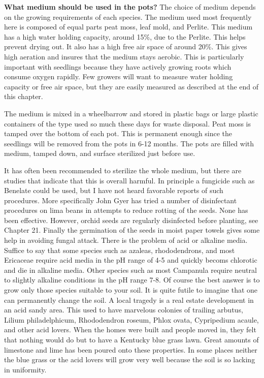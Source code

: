 \textbf{What medium should be used in the pots?} The choice of medium
depends on the growing requirements of each species. The medium used most
frequently here is composed of equal parts peat moss, leaf mold, and Perlite. This
medium has a high water holding capacity, around 15\%, due to the Perlite. This helps
prevent drying out. It also has a high free air space of around 20\%. This gives high
aeration and insures that the medium stays aerobic. This is particularly important with
seedlings because they have actively growing roots which consume oxygen rapidly.
Few growers will want to measure water holding capacity or free air space, but they
are easily measured as described at the end of this chapter.

The medium is mixed in a wheelbarrow and stored in plastic bags or large
plastic containers of the type used so much these days for waste disposal. Peat moss
is tamped over the bottom of each pot. This is permanent enough since the seedlings
will be removed from the pots in 6-12 months. The pots are filled with medium, tamped
down, and surface sterilized just before use.

It has often been recommended to sterilize the whole medium, but there are
studies that indicate that this is overall harmful. In principle a fungicide such as
Benelate could be used, but I have not heard favorable reports of such procedures.
More specifically John Gyer has tried a number of disinfectant procedures on lima
beans in attempts to reduce rotting of the seeds. None has been effective. However,
orchid seeds are regularly disinfected before planting, see Chapter 21. Finally the
germination of the seeds in moist paper towels gives some help in avoiding fungal
attack. There is the problem of acid or alkaline media. Suffice to say that some species
such as azaleas, rhododendrons, and most Ericaceae require acid media in the pH
range of 4-5 and quickly becoms chlorotic and die in alkaline media. Other species
such as most Campanula require neutral to slightly alkaline conditions in the pH range
7-8. Of course the best answer is to grow only those species suitable to your soil. It is
quite futile to imagine that one can permanently change the soil. A local tragedy is a
real estate development in an acid sandy area. This used to have marvelous colonies
of trailing arbutus, Lilium philadelphicum, Rhododendron roseum, Phlox ovata,
Cypripedium acaule, and other acid lovers. When the homes were built and people
moved in, they felt that nothing would do but to have a Kentucky blue grass lawn.
Great amounts of limestone and lime has been poured onto these properties. In some
places neither the blue grass or the acid lovers will grow very well because the soil is
so lacking in uniformity.

